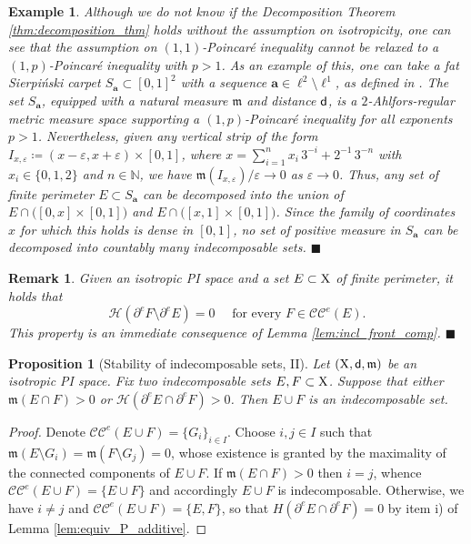 \documentclass[reqno]{amsart}
\numberwithin{equation}{section}
\newcommand{\N}{\mathbb{N}}
\newcommand{\X}{{\rm X}}
\newcommand{\sfd}{{\sf d}}
\newcommand{\mm}{\mathfrak m}
\newcommand{\1}{\mathbbm 1}
\newcommand{\eps}{\varepsilon}
\renewcommand{\H}{{\mathcal H}}
\newcommand{\CC}{\mathcal{CC}^e}
\newcommand{\fr}{\penalty-20\null\hfill\(\blacksquare\)}
\newtheorem{proposition}[theorem]{Proposition}
\newtheorem{example}[theorem]{Example}
\newtheorem{remark}[theorem]{Remark}
\begin{document}
%
%
\begin{example}\label{ex:doubling_fails_decomp}{\rm
Although we do not know if the Decomposition Theorem \ref{thm:decomposition_thm} holds without the assumption
on isotropicity, one can see that the assumption on \((1,1)\)-Poincar\'e inequality
cannot be relaxed to a \((1,p)\)-Poincar\'e inequality with \(p>1\). As an example of
this, one can take a fat Sierpi\'nski carpet \(S_\mathbf{a}\subset[0,1]^2\) with a
sequence \(\mathbf{a}\in\ell^2\setminus\ell^1\), as defined in \cite{MTW13}.
The set \(S_\mathbf{a}\), equipped with a natural measure \(\mm\) and distance \(\sfd\),
is a \(2\)-Ahlfors-regular metric measure space supporting a \((1,p)\)-Poincar\'e
inequality for all exponents \(p>1\). Nevertheless, given any vertical strip of the form
\(I_{x,\varepsilon}\coloneqq(x-\eps,x+\eps)\times [0,1]\), where
\(x=\sum_{i=1}^n x_i\,3^{-i}+2^{-1}\,3^{-n}\) with \(x_i\in\{0,1,2\}\) and \(n\in\N\),
we have \(\mm(I_{x,\eps})/\eps\to 0\) as \(\eps\to 0\). Thus, any set of finite perimeter
\(E\subset S_\mathbf{a}\) can be decomposed into the union of
\(E\cap\big([0,x]\times[0,1]\big)\) and \(E\cap\big([x,1]\times[0,1]\big)\).
Since the family of coordinates \(x\) for which this holds is dense in \([0,1]\),
no set of positive measure in \(S_\mathbf{a}\) can be decomposed into countably
many indecomposable sets.
\fr}\end{example}
%
%
\begin{remark}\label{rmk:bdry_holes}{\rm
Given an isotropic PI space and a set \(E\subset\X\) of finite perimeter, it holds that
\begin{equation}\label{eq:bdry_holes}
\H(\partial^e F\setminus\partial^e E)=0\quad\text{ for every }F\in\CC(E).
\end{equation}
This property is an immediate consequence of Lemma \ref{lem:incl_front_comp}.
\fr}\end{remark}
%
%
\begin{proposition}[Stability of indecomposable sets, II]\label{prop:stab_union_indec_II}
Let \((\X,\sfd,\mm)\) be an isotropic PI space. Fix two indecomposable sets
\(E,F\subset\X\). Suppose that either \(\mm(E\cap F)>0\) or
\(\H(\partial^e E\cap\partial^e F)>0\). Then \(E\cup F\) is an indecomposable set.
\end{proposition}
\begin{proof}
Denote \(\CC(E\cup F)=\{G_i\}_{i\in I}\). Choose \(i,j\in I\) such that
\(\mm(E\setminus G_i)=\mm(F\setminus G_j)=0\), whose existence is granted by the
maximality of the connected components of \(E\cup F\). If \(\mm(E\cap F)>0\) then
\(i=j\), whence \(\CC(E\cup F)=\{E\cup F\}\) and accordingly \(E\cup F\) is
indecomposable. Otherwise, we have \(i\neq j\) and \(\CC(E\cup F)=\{E,F\}\),
so that \(H(\partial^e E\cap\partial^e F)=0\) by item i) of Lemma
\ref{lem:equiv_P_additive}.
\end{proof}
\end{document}
